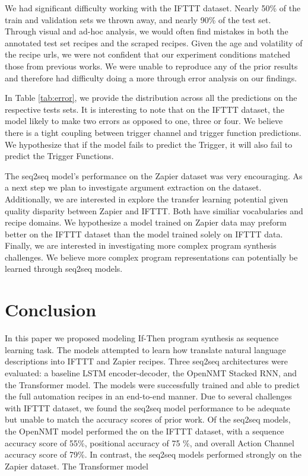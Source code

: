 \documentclass[letterpaper]{article} %
\begin{document}
We had significant difficulty working with the IFTTT dataset. Nearly 50\% of the train and validation sets we thrown away, and nearly 90\% of the test set. Through visual and ad-hoc analysis, we would often find mistakes in both the annotated test set recipes and the scraped recipes. Given the age and volatility of the recipe urls, we were not confident that our experiment conditions matched those from previous works. We were unable to reproduce any of the prior results and therefore had difficulty doing a more through error analysis on our findings.

In Table \ref{tab:error}, we provide the distribution across all the predictions on the respective tests sets. It is interesting to note that on the IFTTT dataset, the model likely to make two errors as opposed to one, three or four. We believe there is a tight coupling between trigger channel and trigger function predictions. We hypothesize that if the model fails to predict the Trigger, it will also fail to predict the Trigger Functions.

The seq2seq model's performance on the Zapier dataset was very encouraging. As a next step we plan to investigate argument extraction on the dataset. Additionally, we are interested in explore the transfer learning potential given quality disparity between Zapier and IFTTT. Both have similiar vocabularies and recipe domains. We hypothesize a model trained on Zapier data may preform better on the IFTTT dataset than the model trained solely on IFTTT data. Finally, we are interested in investigating more complex program synthesis challenges. We believe more complex program representations can potentially be learned through seq2seq models.


\section{Conclusion}
In this paper we proposed modeling If-Then program synthesis as sequence learning task. The models attempted to learn how translate natural language descriptions into IFTTT and Zapier recipes. Three seq2seq architectures were evaluated: a baseline LSTM encoder-decoder, the OpenNMT Stacked RNN, and the Transformer model. The models were successfully trained and able to predict the full automation recipes in an end-to-end manner. Due to several challenges with IFTTT dataset, we found the seq2seq model performance to be adequate but unable to match the accuracy scores of prior work. Of the seq2seq models, the OpenNMT model performed the on the IFTTT dataset, with a sequence accuracy score of 55\%, positional accuracy of 75 \%, and overall Action Channel accuracy score of 79\%. In contrast, the seq2seq models performed strongly on the Zapier dataset. The Transformer model


\clearpage

\end{document}
